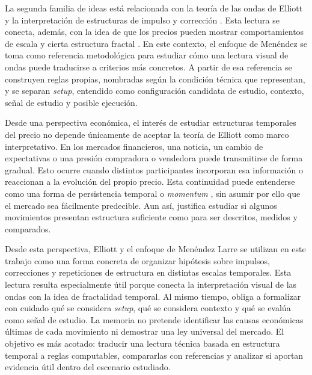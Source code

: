 La segunda familia de ideas est\'a relacionada con la teor\'ia de las ondas de
Elliott y la interpretaci\'on de estructuras de impulso y correcci\'on
\cite{frost_prechter_1985_elliott,balan_1989_elliott_fx,menendez_larre_2016_ondas}.
Esta lectura se conecta, adem\'as, con la idea de que los precios pueden mostrar
comportamientos de escala y cierta estructura fractal
\cite{mandelbrot_1963_speculative_prices,mandelbrot_hudson_2004_misbehavior}.
En este contexto, el enfoque de Men\'endez se toma como referencia metodol\'ogica
para estudiar c\'omo una lectura visual de ondas puede traducirse a criterios
m\'as concretos. A partir de esa referencia se construyen reglas propias,
nombradas seg\'un la condici\'on t\'ecnica que representan, y se separan
\textit{setup}, entendido como configuraci\'on candidata de estudio, contexto,
se\~nal de estudio y posible ejecuci\'on.

Desde una perspectiva econ\'omica, el inter\'es de estudiar estructuras temporales
del precio no depende \'unicamente de aceptar la teor\'ia de Elliott como marco
interpretativo. En los mercados financieros, una noticia, un cambio de
expectativas o una presi\'on compradora o vendedora puede transmitirse de forma
gradual. Esto ocurre cuando distintos participantes incorporan esa informaci\'on
o reaccionan a la evoluci\'on del propio precio. Esta continuidad puede entenderse
como una forma de persistencia temporal o \textit{momentum}
\cite{jegadeesh_titman_1993_momentum}, sin asumir por ello que el mercado sea
f\'acilmente predecible. Aun as\'i, justifica estudiar si algunos movimientos
presentan estructura suficiente como para ser descritos, medidos y comparados.

Desde esta perspectiva, Elliott y el enfoque de Men\'endez Larre se utilizan en
este trabajo como una forma concreta de organizar hip\'otesis sobre impulsos,
correcciones y repeticiones de estructura en distintas escalas temporales. Esta
lectura resulta especialmente \'util porque conecta la interpretaci\'on visual de
las ondas con la idea de fractalidad temporal. Al mismo tiempo, obliga a
formalizar con cuidado qu\'e se considera \textit{setup}, qu\'e se considera
contexto y qu\'e se eval\'ua como se\~nal de estudio. La memoria no pretende identificar las causas
econ\'omicas \'ultimas de cada movimiento ni demostrar una ley universal del
mercado. El objetivo es m\'as acotado: traducir una lectura t\'ecnica basada en
estructura temporal a reglas computables, compararlas con referencias y analizar
si aportan evidencia \'util dentro del escenario estudiado.


